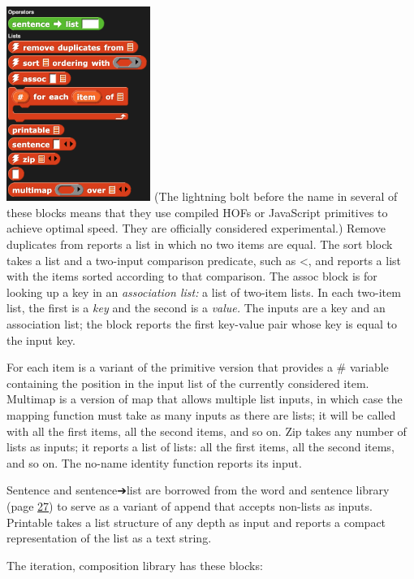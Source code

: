 \includegraphics[width=1.84861in,height=2.49236in]{media/image387.png}
(The lightning bolt before the name in several of these blocks means
that they use compiled HOFs or JavaScript primitives to achieve optimal
speed. They are officially considered experimental.) Remove duplicates
from reports a list in which no two items are equal. The sort block
takes a list and a two-input comparison predicate, such as \textless,
and reports a list with the items sorted according to that comparison.
The assoc block is for looking up a key in an \emph{association list:} a
list of two-item lists. In each two-item list, the first is a \emph{key}
and the second is a \emph{value.} The inputs are a key and an
association list; the block reports the first key-value pair whose key
is equal to the input key.

For each item is a variant of the primitive version that provides a \#
variable containing the position in the input list of the currently
considered item. Multimap is a version of map that allows multiple list
inputs, in which case the mapping function must take as many inputs as
there are lists; it will be called with all the first items, all the
second items, and so on. Zip takes any number of lists as inputs; it
reports a list of lists: all the first items, all the second items, and
so on. The no-name identity function reports its input.

Sentence and sentence➔list are borrowed from the word and sentence
library (page \hyperref[wordsent]{27}) to serve as a variant of append
that accepts non-lists as inputs. Printable takes a list structure of
any depth as input and reports a compact representation of the list as a
text string.

The iteration, composition library has these blocks:


